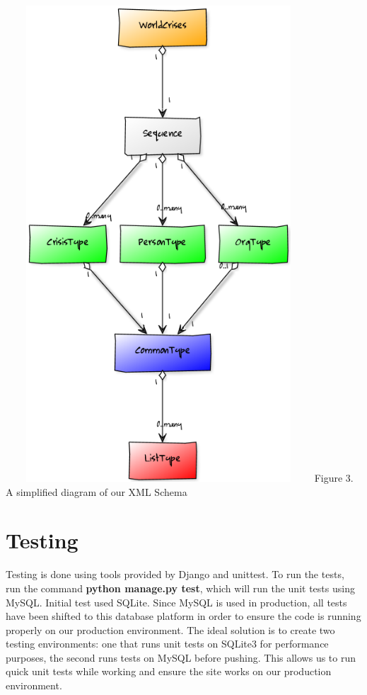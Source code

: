 \documentclass[12pt]{report}
\begin{document}
\newpage
\includegraphics*[width=4.5in,height=7in]{xmlSchemaDiagram.png}
\newline
\footnotesize
Figure 3. A simplified diagram of our XML Schema %
\normalsize
\hfill\newline

\newpage
\section*{Testing}
\hfill


Testing is done using tools provided by Django and unittest.
To run the tests, run the command \textbf{python manage.py test}, which will run the unit tests using MySQL.
Initial test used SQLite. Since MySQL is used in production, all tests have been shifted to this database platform in order to ensure the code
is running properly on our production environment.
The ideal solution is to create two testing environments: one that runs unit tests on SQLite3 for performance purposes,
the second runs tests on MySQL before pushing.
This allows us to run quick unit tests while working and ensure the site works on our production environment.
\end{document}
